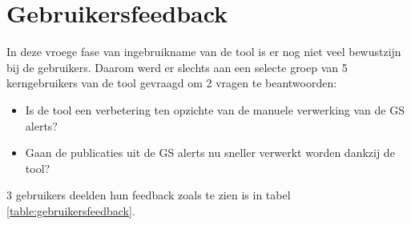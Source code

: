 \section{Gebruikersfeedback}
\label{gebruikersfeedback}
In deze vroege fase van ingebruikname van de tool is er nog niet veel bewustzijn bij de gebruikers.
Daarom werd er slechts aan een selecte groep van 5 kerngebruikers van de tool gevraagd om 2 vragen te beantwoorden:
\begin{itemize}
    \item Is de tool een verbetering ten opzichte van de manuele verwerking van de GS alerts?
    \item Gaan de publicaties uit de GS alerts nu sneller verwerkt worden dankzij de tool?
\end{itemize}
3 gebruikers deelden hun feedback zoals te zien is in tabel \ref{table:gebruikersfeedback}.
